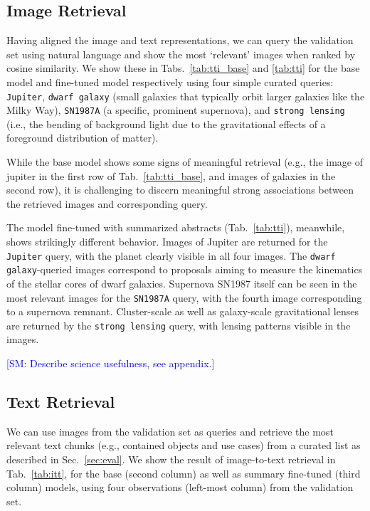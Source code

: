 \documentclass[10pt]{article} %
\newcommand{\SM}[1]{\textcolor{blue}{[SM: #1]}}
\begin{document}
\subsection{Image Retrieval}

Having aligned the image and text representations, we can query the validation set using natural language and show the most `relevant' images when ranked by cosine similarity.
%
We show these in Tabs.~\ref{tab:tti_base} and \ref{tab:tti} for the base model and fine-tuned model respectively using four simple curated queries: \texttt{Jupiter}, \texttt{dwarf galaxy} (small galaxies that typically orbit larger galaxies like the Milky Way), \texttt{SN1987A} (a specific, prominent supernova), and \texttt{strong lensing} (i.e., the bending of background light due to the gravitational effects of a foreground distribution of matter).

While the base model shows some signs of meaningful retrieval (e.g., the image of jupiter in the first row of Tab.~\ref{tab:tti_base}, and images of galaxies in the second row), it is challenging to discern meaningful strong associations between the retrieved images and corresponding query.

The model fine-tuned with summarized abstracts (Tab.~\ref{tab:tti}), meanwhile, shows strikingly different behavior.
%
%
Images of Jupiter are returned for the \texttt{Jupiter} query, with the planet clearly visible in all four images.
%
The \texttt{dwarf galaxy}-queried images correspond to proposals aiming to measure the kinematics of the stellar cores of dwarf galaxies.
%
Supernova SN1987 itself can be seen in the most relevant images for the \texttt{SN1987A} query, with the fourth image corresponding to a supernova remnant.
%
Cluster-scale as well as galaxy-scale gravitational lenses are returned by the \texttt{strong lensing} query, with lensing patterns visible in the images.

\SM{Describe science usefulness, see appendix.}

\subsection{Text Retrieval}

We can use images from the validation set as queries and retrieve the most relevant text chunks (e.g., contained objects and use cases) from a curated list as described in Sec.~\ref{sec:eval}.
%
We show the result of image-to-text retrieval in Tab.~\ref{tab:itt}, for the base (second column) as well as summary fine-tuned (third column) models, using four observations (left-most column) from the validation set.
\end{document}
